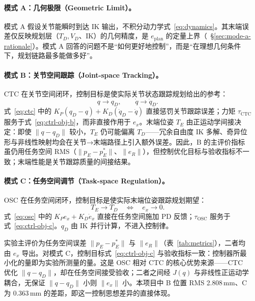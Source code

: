 \documentclass[UTF8, a4paper, 12pt]{ctexart}
\begin{document}
\paragraph{模式 A：几何极限（Geometric Limit）。}
模式 A 假设关节能瞬时到达 IK 输出，不积分动力学式~\eqref{eq:dynamics}。其末端误差仅反映规划层（$T_D,V_D$、IK）的几何精度，是 $e_{\mathrm{plan}}$ 的定量上界（~\S\ref{sec:mode-a-rationale}）。模式 A 回答的问题不是``如何更好地控制''，而是``在理想几何条件下，规划链路最多能做多好''。

\paragraph{模式 B：关节空间跟踪（Joint-space Tracking）。}
CTC 在关节空间闭环，控制目标是使实际关节状态跟踪规划给出的参考：
\begin{equation}
    q \rightarrow q_D, \qquad \dot{q} \rightarrow \dot{q}_D.
    \label{eq:ctrl-obj-b}
\end{equation}
式~\eqref{eq:ctc} 中的 $K_P(q_D-q)+K_D(\dot{q}_D-\dot{q})$ 直接惩罚关节跟踪误差；力矩 $\tau_{\mathrm{CTC}}$ 服务于式~\eqref{eq:ctrl-obj-b}，而非直接作用于 $e_x$。末端位姿 $T_E$ 由正运动学间接决定：即使 $\|q-q_D\|$ 较小，$T_E$ 仍可能偏离 $T_D$——冗余自由度 IK 多解、奇异位形与非线性映射均会在关节→末端路径上引入额外误差。因此，B 的主评价指标虽仍用任务空间 RMS（$\|p_E-p_E^*\|$、$\|e_R\|$），但控制优化目标与验收指标不一致；末端性能是关节跟踪质量的间接结果。

\paragraph{模式 C：任务空间调节（Task-space Regulation）。}
OSC 在任务空间闭环，控制目标是使实际末端位姿跟踪规划期望：
\begin{equation}
    T_E \rightarrow T_D
    \quad \Longleftrightarrow \quad
    e_x \rightarrow 0.
    \label{eq:ctrl-obj-c}
\end{equation}
式~\eqref{eq:osc} 中的 $K_P e_x + K_D \dot{e}_x$ 直接在任务空间施加 PD 反馈；$\tau_{\mathrm{OSC}}$ 服务于式~\eqref{eq:ctrl-obj-c}。$q_D$ 由 IK 并行计算，不进入控制律。

实验主评价为任务空间误差 $\|p_E-p_E^*\|$ 与 $\|e_R\|$（表~\ref{tab:metrics}），二者均由 $e_x$ 导出。对模式 C，控制目标式~\eqref{eq:ctrl-obj-c} 与验收指标一致：控制器所最小化的量即为实验所测量的量。这是 OSC 相对 CTC 的核心优势来源——CTC 优化 $\|q-q_D\|$，却在任务空间接受验收；二者之间经 $J(q)$ 与非线性正运动学耦合，无保证 $\|q-q_D\|$ 小则 $\|e_x\|$ 小。本项目中 B 位置 RMS 2.808\,mm、C 为 0.363\,mm 的差距，即这一控制思想差异的直接体现。
\end{document}
